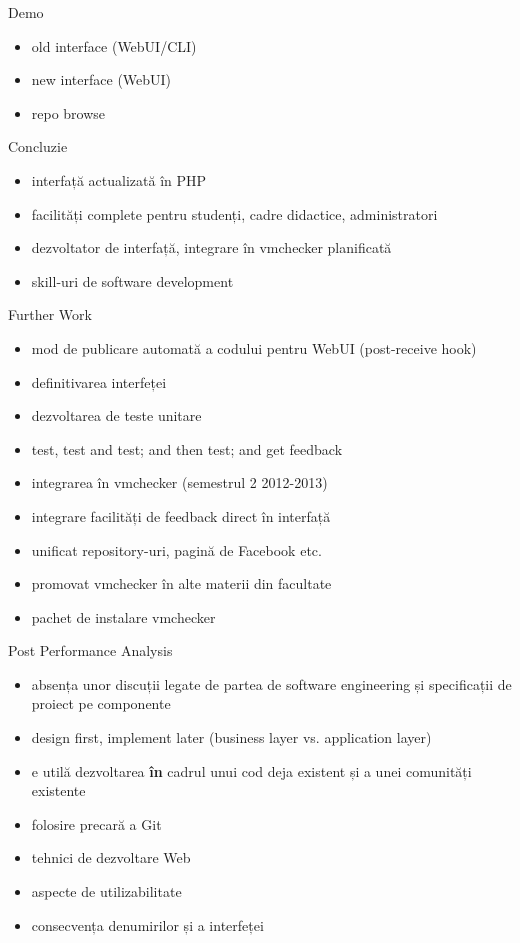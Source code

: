 \documentclass{simple}
\begin{document}
\begin{frame}{Demo}
  \begin{itemize}
    \item old interface (WebUI/CLI)
    \item new interface (WebUI)
    \item repo browse
  \end{itemize}
\end{frame}

\begin{frame}{Concluzie}
  \begin{itemize}
    \item interfață actualizată în PHP
    \item facilități complete pentru studenți, cadre didactice, administratori
    \item dezvoltator de interfață, integrare în vmchecker planificată
    \item skill-uri de software development
  \end{itemize}
\end{frame}

\begin{frame}{Further Work}
  \begin{itemize}
    \item mod de publicare automată a codului pentru WebUI (post-receive hook)
    \item definitivarea interfeței
    \item dezvoltarea de teste unitare
    \item test, test and test; and then test; and get feedback
    \item integrarea în vmchecker (semestrul 2 2012-2013)
    \item integrare facilități de feedback direct în interfață
    \item unificat repository-uri, pagină de Facebook etc.
    \item promovat vmchecker în alte materii din facultate
    \item pachet de instalare vmchecker
  \end{itemize}
\end{frame}

\begin{frame}{Post Performance Analysis}
  \begin{itemize}
    \item absența unor discuții legate de partea de software engineering și
      specificații de proiect pe componente
    \item design first, implement later (business layer vs. application layer)
    \item e utilă dezvoltarea \textbf{în} cadrul unui cod deja existent și a
      unei comunități existente
    \item folosire precară a Git
    \item tehnici de dezvoltare Web
    \item aspecte de utilizabilitate
    \item consecvența denumirilor și a interfeței
  \end{itemize}
\end{frame}
\end{document}
